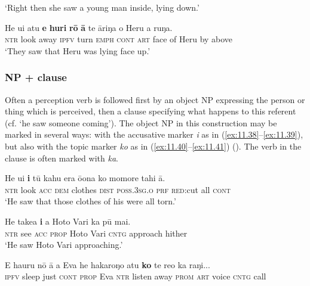 \glt 
‘Right then she saw a young man inside, lying down.’ \textstyleExampleref{[R310.045]} 
\z

\ea\label{ex:11.37}
\gll He u{\ꞌ}i atu \textbf{e} \textbf{huri} \textbf{rō} \textbf{{\ꞌ}ā} te {\ꞌ}āriŋa o Heru a ruŋa. \\
\textsc{ntr} look away \textsc{ipfv} turn \textsc{emph} \textsc{cont} \textsc{art} face of Heru by above \\

\glt 
‘They saw that Heru was lying face up.’ \textstyleExampleref{[R313.043]} 
\z
{}
\subsubsection[NP + clause]{NP + clause}\label{sec:11.3.1.2}

Often a perception verb is followed first by an object NP expressing the person or thing which is perceived, then a clause specifying what happens to this referent (cf.  ‘he saw someone coming’). The object NP in this construction may be marked in several ways: with the accusative marker \textit{i} as in (\ref{ex:11.38}–\ref{ex:11.39}), but also with the topic marker \textit{ko} as in (\ref{ex:11.40}–\ref{ex:11.41}) (). The verb in the  clause is often marked with \textit{ka}.

\ea\label{ex:11.38}
\gll He u{\ꞌ}i \textbf{i} tū kahu era ō{\ꞌ}ona ko momore tahi {\ꞌ}ā.\textup{} \\
\textsc{ntr} look \textsc{acc} \textsc{dem} clothes \textsc{dist} \textsc{poss.3sg.o} \textsc{prf} \textsc{red}:cut all \textsc{cont} \\

\glt 
‘He saw that those clothes of his were all torn.’ \textstyleExampleref{[R250.017]} 
\z

\ea\label{ex:11.39}
\gll He take{\ꞌ}a \textbf{i} a Hoto Vari ka pū mai. \\
\textsc{ntr} see \textsc{acc} \textsc{prop} Hoto Vari \textsc{cntg} approach hither \\

\glt 
‘He saw Hoto Vari approaching.’ \textstyleExampleref{[R304.004]} 
\z

\ea\label{ex:11.40}
\gll E ha{\ꞌ}uru nō {\ꞌ}ā a Eva he hakaroŋo atu \textbf{ko} te re{\ꞌ}o ka raŋi... \\
\textsc{ipfv} sleep just \textsc{cont} \textsc{prop} Eva \textsc{ntr} listen away \textsc{prom} \textsc{art} voice \textsc{cntg} call \\

